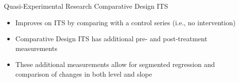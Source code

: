 \documentclass[10pt]{beamer}
\begin{document}
\begin{frame}{Quasi-Experimental Research}
Comparative Design ITS
    \begin{itemize}
        \item Improves on ITS by comparing with a control series (i.e., no intervention)
        \item Comparative Design ITS has additional pre- and post-treatment measurements
        \item These additional measurements allow for segmented regression and comparison of changes in both level and slope
    \end{itemize}

\begin{table}
    \tabcolsep 3pt
    \label{tab:its2}
\end{table}
\end{frame}
\end{document}
